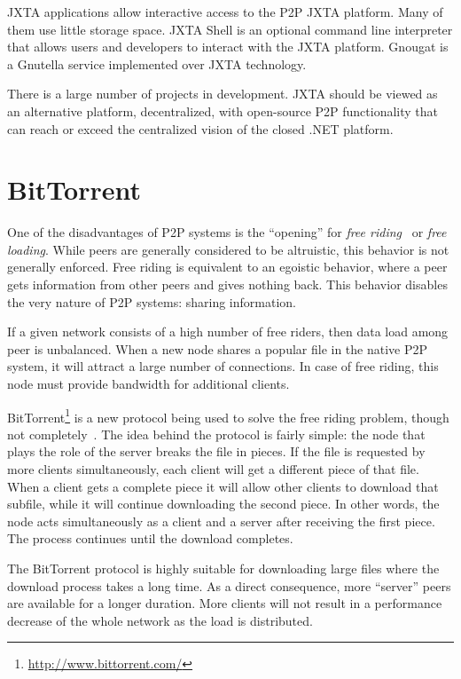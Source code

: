 JXTA applications allow interactive access to the P2P JXTA platform. Many of them
use little storage space. JXTA Shell is an optional command line interpreter
that allows users and developers to interact with the JXTA platform. Gnougat is a
Gnutella service implemented over JXTA technology.

There is a large number of projects in development. JXTA should be viewed as an
alternative platform, decentralized, with open-source P2P functionality that
can reach or exceed the centralized vision of the closed .NET platform.

\section{BitTorrent}
\label{sec:p2p-systems:bittorrent}

One of the disadvantages of P2P systems is the ``opening'' for \textit{free
riding}~\cite{free-riding} or \textit{free loading}. While peers are generally
considered to be altruistic, this behavior is not generally enforced. Free
riding is equivalent to an egoistic behavior, where a peer gets information
from other peers and gives nothing back. This behavior disables the very
nature of P2P systems: sharing information.

If a given network consists of a high number of free riders, then data load
among peer is unbalanced. When a new node shares a popular file in the native
P2P system, it will attract a large number of connections. In case of free
riding, this node must provide bandwidth for additional clients.

BitTorrent\footnote{\url{http://www.bittorrent.com/}} is a new protocol being used to solve the free riding problem,
though not completely~\cite{free-riding}. The idea behind the protocol is
fairly simple: the node that plays the role of the server breaks the file in
pieces. If the file is requested by more clients simultaneously, each client
will get a different piece of that file. When a client gets a complete piece
it will allow other clients to download that subfile, while it will continue
downloading the second piece. In other words, the node acts simultaneously as
a client and a server after receiving the first piece. The process continues
until the download completes.

The BitTorrent protocol is highly suitable for downloading large files where
the download process takes a long time. As a direct consequence, more
``server'' peers are available for a longer duration. More clients will not
result in a performance decrease of the whole network as the load is
distributed.

